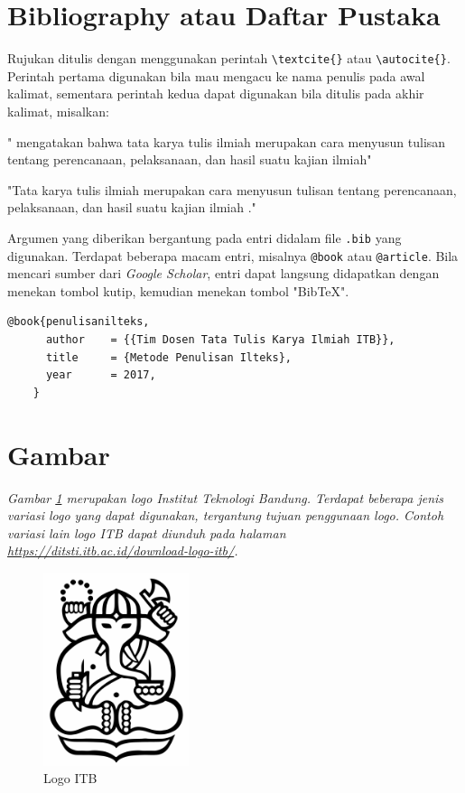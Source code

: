 \section{Bibliography atau Daftar Pustaka}

Rujukan ditulis dengan menggunakan perintah \verb|\textcite{}| atau  \verb|\autocite{}|. Perintah pertama digunakan bila mau mengacu ke nama penulis pada awal kalimat, sementara perintah kedua dapat digunakan bila ditulis pada akhir kalimat, misalkan: 

\begin{displayquote}
    "\textcite{penulisanilteks} mengatakan bahwa tata karya tulis ilmiah merupakan cara menyusun tulisan tentang perencanaan, pelaksanaan, dan hasil suatu kajian ilmiah"
    
    "Tata karya tulis ilmiah merupakan cara menyusun tulisan tentang perencanaan, pelaksanaan, dan hasil suatu kajian ilmiah \autocite{penulisanilteks}."
\end{displayquote}

Argumen yang diberikan bergantung pada entri didalam file \texttt{.bib} yang digunakan. Terdapat beberapa macam entri, misalnya \verb|@book| atau \verb|@article|. Bila mencari sumber dari \textit{Google Scholar}, entri dapat langsung didapatkan dengan menekan tombol kutip, kemudian menekan tombol "BibTeX". 

\begin{lstlisting}[caption={Contoh entri dalam BibTeX}]
    @book{penulisanilteks,
      author    = {{Tim Dosen Tata Tulis Karya Ilmiah ITB}}, 
      title     = {Metode Penulisan Ilteks},
      year      = 2017,
    }
\end{lstlisting}

\section{Gambar}

\textit{Gambar \ref{gambar:logo_itb} merupakan logo Institut Teknologi Bandung. Terdapat beberapa jenis variasi logo yang dapat digunakan, tergantung tujuan penggunaan logo. Contoh variasi lain logo ITB dapat diunduh pada halaman \url{https://ditsti.itb.ac.id/download-logo-itb/}.}

\begin{figure}[h]
    \centering
  	\includegraphics[width=0.38\textwidth]{aset/logo-itb.jpg}
  	\caption{Logo ITB}
  	\label{gambar:logo_itb}
\end{figure}

